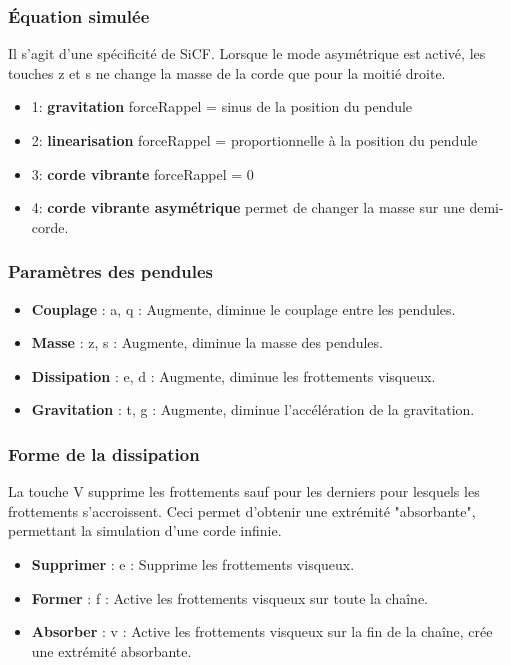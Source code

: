 \subsubsection{Équation simulée}
%
Il s'agit d'une spécificité de SiCF. Lorsque le mode asymétrique est activé, les touches {\sf z} et {\sf s} ne change la masse de la corde que pour la moitié droite. 
%
\begin{itemize}[leftmargin=2cm, label=, itemsep=0pt]%
\item 1: {\bf gravitation} forceRappel = sinus de la position du pendule
\item 2: {\bf linearisation} forceRappel = proportionnelle à la position du pendule
\item 3: {\bf corde vibrante} forceRappel = 0
\item 4: {\bf corde vibrante asymétrique} permet de changer la masse sur une demi-corde.
\end{itemize}
%
\subsubsection{Paramètres des pendules}
%
\begin{itemize}[label=, leftmargin=2cm, itemsep=0pt]
\item {\bf Couplage} : {\sf a}, {\sf q} : Augmente, diminue le couplage entre les pendules.
\item {\bf Masse} : {\sf z}, {\sf s} :  Augmente, diminue la masse des pendules.
\item {\bf Dissipation} : {\sf e}, {\sf d} :  Augmente, diminue les frottements visqueux.
\item {\bf Gravitation} : {\sf t}, {\sf g} :  Augmente, diminue l'accélération de la gravitation.
\end{itemize}
%
%
\subsubsection{Forme de la dissipation}
%
La touche {\sf V} supprime les frottements sauf pour les derniers pour lesquels les frottements s'accroissent. Ceci permet d'obtenir une extrémité "absorbante", permettant la simulation d'une corde infinie.
%
\begin{itemize}[label=, leftmargin=2cm, itemsep=0pt]
\item {\bf Supprimer} : {\sf e} : Supprime les frottements visqueux.
\item {\bf Former} : {\sf f} : Active les frottements visqueux sur toute la chaîne.
\item {\bf Absorber} : {\sf v} : Active les frottements visqueux sur la fin de la chaîne, crée une extrémité absorbante.
\end{itemize}
%
%

